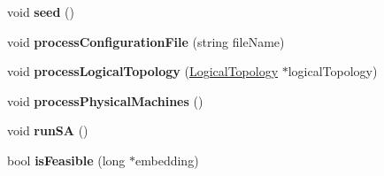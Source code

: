 \begin{DoxyCompactItemize}
\item 
\hypertarget{classGuaranteedEmbedding_a203b3f3f1a80641f297c627a9364d19d}{void {\bfseries seed} ()}\label{classGuaranteedEmbedding_a203b3f3f1a80641f297c627a9364d19d}

\item 
\hypertarget{classGuaranteedEmbedding_a85758e2cde663ea3290f762f59db89ed}{void {\bfseries process\-Configuration\-File} (string file\-Name)}\label{classGuaranteedEmbedding_a85758e2cde663ea3290f762f59db89ed}

\item 
\hypertarget{classGuaranteedEmbedding_ab66ef914935de10969cf6bfce9cd61c1}{void {\bfseries process\-Logical\-Topology} (\hyperlink{classLogicalTopology}{\-Logical\-Topology} $\ast$logical\-Topology)}\label{classGuaranteedEmbedding_ab66ef914935de10969cf6bfce9cd61c1}

\item 
\hypertarget{classGuaranteedEmbedding_ab08b480be9b8cc686021f993ed19b025}{void {\bfseries process\-Physical\-Machines} ()}\label{classGuaranteedEmbedding_ab08b480be9b8cc686021f993ed19b025}

\item 
\hypertarget{classGuaranteedEmbedding_ac207623d2022e7a9b99c896e4bcf8604}{void {\bfseries run\-S\-A} ()}\label{classGuaranteedEmbedding_ac207623d2022e7a9b99c896e4bcf8604}

\item 
\hypertarget{classGuaranteedEmbedding_a204a8e4911348830ed61485864b3fc8b}{bool {\bfseries is\-Feasible} (long $\ast$embedding)}\label{classGuaranteedEmbedding_a204a8e4911348830ed61485864b3fc8b}

\end{DoxyCompactItemize}
